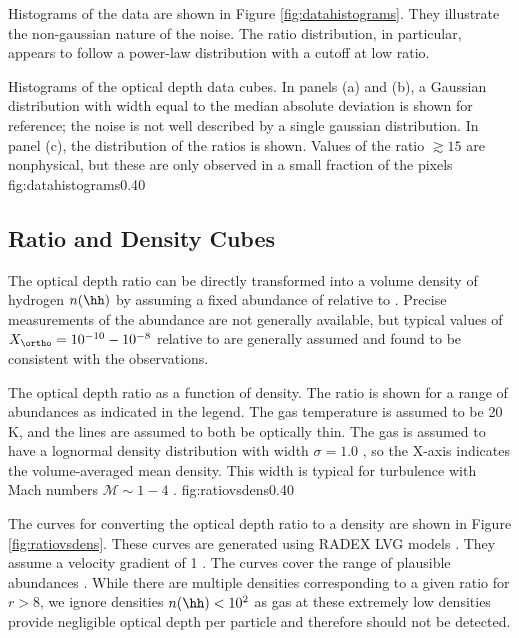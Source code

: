 Histograms of the data are shown in Figure \ref{fig:datahistograms}.  They
illustrate the non-gaussian nature of the noise.  The ratio distribution, in
particular, appears to follow a power-law distribution with a cutoff at low
ratio.

{Histograms of the optical depth data cubes.  In panels (a) and (b),
a Gaussian distribution with width equal to the median absolute deviation
is shown for reference; the noise is not well described by a single gaussian
distribution.  In panel (c), the distribution of the ratios is shown.
Values of the ratio $\gtrsim15$ are nonphysical, but these are only observed
in a small fraction of the pixels}
{fig:datahistograms}{0.4}{0}


\subsection{Ratio and Density Cubes}
\label{sec:ratiodenscubes}
The \formaldehyde optical depth ratio can be directly transformed into a volume
density of hydrogen $n(\hh)$ by assuming a fixed abundance of \formaldehyde
relative to \hh.  Precise measurements of the \formaldehyde abundance are not
generally available, but typical values of $X_{\ortho} = 10^{-10}-10^{-8}$
relative to \hh are generally assumed \citep{Mangum1993a, Ginsburg2011a,
Ginsburg2013a, Ao2013a} and found to be consistent with the observations.

{The optical depth ratio as a function of \hh density.  The ratio is shown for
a range of \formaldehyde abundances as indicated in the legend.
The gas temperature is assumed to be 20 K, and the \formaldehyde lines
are assumed to both be optically thin.  The gas is assumed to have a
lognormal density distribution with width $\sigma=1.0$ \citep[see ][ for
details]{Ginsburg2013a}, so the X-axis indicates the volume-averaged
mean \hh density.  This width is typical for turbulence with Mach numbers
$\mathcal{M}\sim1-4$ \citep{Federrath2008a}.}
{fig:ratiovsdens}{0.4}{0}

The curves for converting the optical depth ratio to a density are shown in
Figure \ref{fig:ratiovsdens}.  These curves are generated using RADEX LVG models
\citep[python wrapper \url{https://github.com/keflavich/pyradex/}; original
code][]{van-Der-Tak2007a}.  They assume a velocity gradient of 1 \kms \perpc.
The curves cover the range of plausible \formaldehyde abundances
\citep{Mangum1993a}.  While there are multiple densities corresponding to a
given ratio for $r>8$, we ignore densities $n(\hh)<10^2$ \percc as gas at these
extremely low densities provide negligible optical depth per particle and
therefore should not be detected.

